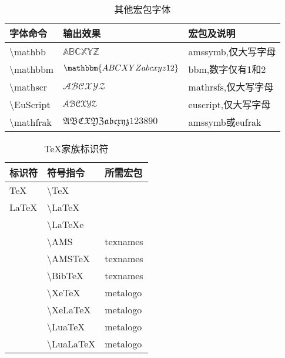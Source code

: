 \documentclass[UTF8,fontset=ubuntu]{ctexart}
\begin{document}
\begin{table}[H]
\begin{minipage}{\textwidth}
\begin{tabular}{l l l}
	\hline
	字体命令 & 输出效果 & 宏包及说明\\\hline
	\textbackslash mathbb & $\mathbb{ABCXYZ}$ & amssymb,仅大写字母\\
	\textbackslash  mathbbm & $\mathbbm{ABCXYZabcxyz12}$ & bbm,数字仅有1和2\\
	\textbackslash  mathscr & $\mathscr{ABCXYZ}$ & mathrsfs,仅大写字母\\
	\textbackslash  EuScript & $\EuScript{ABCXYZ}$ & euscript,仅大写字母\footnotemark[1]\\
	\textbackslash  mathfrak & $\mathfrak{ABCXYZabcxyz123890}$ & amssymb或eufrak\\\hline
\end{tabular}
\end{minipage}
\caption{其他宏包字体}
\end{table}

\begin{table}[H]
\begin{tabular}{l l l}
	\hline
	标识符 & 符号指令 & 所需宏包\\\hline
	\TeX & \textbackslash  TeX &\\
	\LaTeX & \textbackslash  LaTeX &\\
	\LaTeXe & \textbackslash  LaTeXe &\\
	\AMS & \textbackslash  AMS & texnames\\
	\AMSTeX & \textbackslash  AMSTeX & texnames\\
	\BibTeX & \textbackslash  BibTeX & texnames\\
	\XeTeX & \textbackslash  XeTeX & metalogo\\
	\XeLaTeX & \textbackslash  XeLaTeX & metalogo\\
	\LuaTeX & \textbackslash  LuaTeX & metalogo\\
	\LuaLaTeX & \textbackslash  LuaLaTeX & metalogo\\
	\hline
\end{tabular}
\caption{TeX家族标识符}
\end{table}
\end{document}
